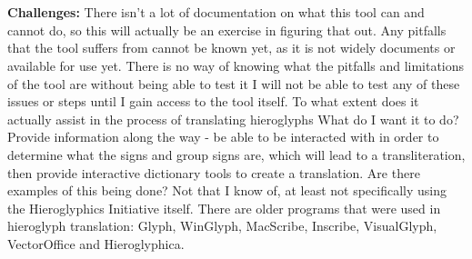 \documentclass{article}
\begin{document}
\paragraph{} ~\\ \noindent \textbf{Challenges:}
\newline \break \noindent
There isn't a lot of documentation on what this tool can and cannot do, so this will actually be an exercise in figuring that out.
\newline \break \noindent
Any pitfalls that the tool suffers from cannot be known yet, as it is not widely documents or available for use yet.
\newline \break \noindent
There is no way of knowing what the pitfalls and limitations of the tool are without being able to test it
\newline \break \noindent
I will not be able to test any of these issues or steps until I gain access to the tool itself.
\newline \break \noindent
To what extent does it actually assist in the process of translating hieroglyphs
\newline \break \noindent
What do I want it to do? Provide information along the way - be able to be interacted with in order to determine what the signs and group signs are, which will lead to a transliteration, then provide interactive dictionary tools to create a translation.
\newline \break \noindent
Are there examples of this being done? Not that I know of, at least not specifically using the Hieroglyphics Initiative itself. There are older programs that were used in hieroglyph translation: Glyph, WinGlyph, MacScribe, Inscribe, VisualGlyph, VectorOffice and Hieroglyphica.

\end{document}
